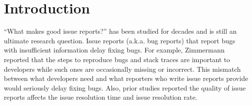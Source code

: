 \section{Introduction}
\label{sec:intro}
``What makes good issue reports?'' has been studied for decades and 
is still an ultimate research question. 
Issue reports (a.k.a. bug reports) that report bugs with 
insufficient information delay fixing bugs. 
For example, Zimmermann~\et~\citep{zimmermann2010TSE} reported 
that the steps to reproduce bugs and stack traces are important 
to developers while such ones are occasionally missing or incorrect. 
This mismatch between what developers need and 
what reporters who write issue reports provide would seriously delay fixing bugs. 
Also, prior studies reported the quality of issue reports affects 
the issue resolution time and 
issue resolution rate. 





